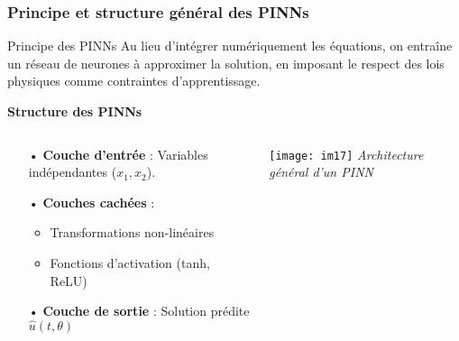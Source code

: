 \documentclass[handout]{beamer}
\newtheorem{pbm et hypo}[thm]{Problématique et hypothèses}
\begin{document}
	\begin{frame}
		\frametitle{Principe et structure général des PINNs}
		\pause
		\begin{block}{Principe des PINNs}
			Au lieu d'intégrer numériquement les équations, on entraîne un réseau de neurones à approximer la solution, en imposant le respect des lois physiques comme contraintes d'apprentissage.
		\end{block}
		
		\textbf{Structure des PINNs}
		\begin{columns}
			\begin{column}{0.5\textwidth}
				\begin{itemize}
					\item[•] \textbf{Couche d'entrée} : Variables indépendantes ($x_1, x_2$).
					\item[•] \textbf{Couches cachées} : 
					\begin{itemize}
						\item Transformations non-linéaires
						\item Fonctions d'activation (tanh, ReLU)
					\end{itemize}
					\item[•] \textbf{Couche de sortie} : Solution prédite $\hat{u}(t,\theta)$
				\end{itemize}
			\end{column}
			\begin{column}{0.5\textwidth}
				\centering
				\texttt{[image: im17]} %
				\footnotesize\textit{Architecture général d'un PINN}
			\end{column}
		\end{columns}
	\end{frame}
\end{document}
